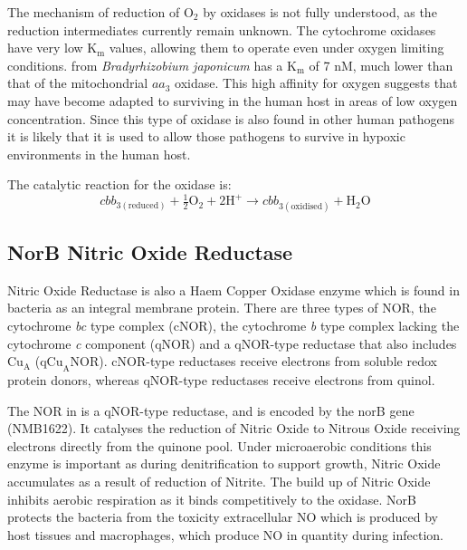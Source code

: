 The mechanism of reduction of $\mathrm{O}_2$ by \cbbthree{} oxidases is not fully understood, as the reduction intermediates currently remain unknown\cite{Huang2010}. The cytochrome \cbbthree{} oxidases have very low $\mathrm{K}_\mathrm{m}$ values, allowing them to operate even under oxygen limiting conditions. \cbbthree{} from \textit{Bradyrhizobium japonicum} has a $\mathrm{K}_\mathrm{m}$ of 7 nM, much lower than that of the mitochondrial $aa_3$ oxidase\cite{Zufferey1996}. This high affinity for oxygen suggests that \Nm{} may have become adapted to surviving in the human host in areas of low oxygen concentration. Since this type of oxidase is also found in other human pathogens it is likely that it is used to allow those pathogens to survive in hypoxic environments in the human host\cite{Preisig1996a}.

The catalytic reaction for the \cbbthree{} oxidase is:
\begin{equation}
cbb_{3\mathrm{(reduced)}} + \tfrac{1}{2}\mathrm{O}_2 + 2\mathrm{H}^+ \rightarrow cbb_{3\mathrm{(oxidised)}} + \mathrm{H}_2\mathrm{O}
\end{equation}

\subsection{NorB Nitric Oxide Reductase}
Nitric Oxide Reductase is also a Haem Copper Oxidase enzyme which is found in bacteria as an integral membrane protein. There are three types of NOR, the cytochrome \textit{bc} type complex (cNOR), the cytochrome \textit{b} type complex lacking the cytochrome \textit{c} component (qNOR) and a qNOR-type reductase that also includes $\mathrm{Cu}_{\mathrm{A}}$ ($\mathrm{qCu}_{\mathrm{A}}\mathrm{NOR}$). cNOR-type reductases receive electrons from soluble redox protein donors, whereas qNOR-type reductases receive electrons from quinol\cite{Householder2000}.

The NOR in \Nm{} is a qNOR-type reductase\cite{Wasser2002}, and is encoded by the norB gene (NMB1622). It catalyses the reduction of Nitric Oxide to Nitrous Oxide receiving electrons directly from the quinone pool. Under microaerobic conditions this enzyme is important as during denitrification to support growth, Nitric Oxide accumulates as a result of reduction of Nitrite. The build up of Nitric Oxide inhibits aerobic respiration as it binds competitively to the \cbbthree{} oxidase. NorB protects the bacteria from the toxicity extracellular NO which is produced by host tissues and macrophages, which produce NO in quantity during infection\cite{Heurlier2008}.

